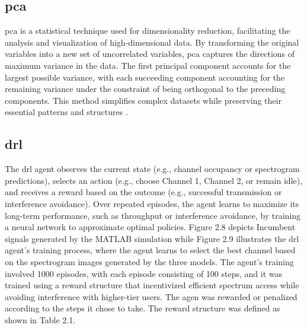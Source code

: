 \subsection{\gls{pca}}
\gls{pca} is a statistical technique used for dimensionality reduction, facilitating the analysis and visualization of high-dimensional data. By transforming the original variables into a new set of uncorrelated variables, \gls{pca} captures the directions of maximum variance in the data. The first principal component accounts for the largest possible variance, with each succeeding component accounting for the remaining variance under the constraint of being orthogonal to the preceding components. This method simplifies complex datasets while preserving their essential patterns and structures \cite{12}.

\subsection{\gls{drl}}
The \gls{drl} agent observes the current state (e.g., channel occupancy or spectrogram predictions), selects an action (e.g., choose Channel 1, Channel 2, or remain idle), and receives a reward based on the outcome (e.g., successful transmission or interference avoidance). Over repeated episodes, the agent learns to maximize its long-term performance, such as throughput or interference avoidance, by training a neural network to approximate optimal policies. Figure 2.8 depicts Incumbent signals generated by the MATLAB simulation while Figure 2.9 illustrates the \gls{drl} agent's training process, where the agent learns to select the best channel based on the spectrogram images generated by the three models. The agent's training involved 1000 episodes, with each episode consisting of 100 steps, and it was trained using a reward structure that incentivized efficient spectrum access while avoiding interference with higher-tier users.
The agen was rewarded or penalized according to the steps it chose to take. The reward structure was defined as shown in Table 2.1.
